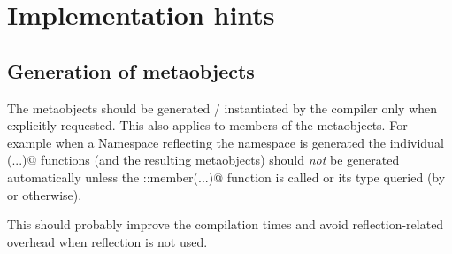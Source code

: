 \section{Implementation hints}

\subsection{Generation of metaobjects}

The metaobjects should be generated / instantiated by the compiler only
when explicitly requested. This also applies to members of the metaobjects. For example when a {\metaobject Namespace}
reflecting the \verb@std@ namespace is generated the individual \verb@member(...)@
functions (and the resulting metaobjects) should {\em not} be generated automatically
unless the \verb@Scope::member(...)@ function is called or its type queried (by \verb@decltype@
or otherwise).

This should probably improve the compilation times and avoid reflection-related
overhead when reflection is not used.
